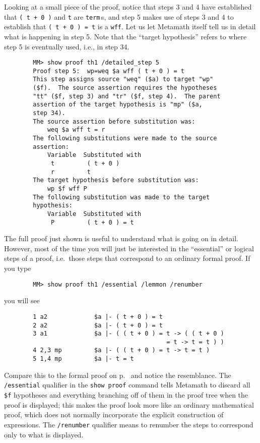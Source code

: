 Looking at a small piece of the proof, notice that steps 3 and 4 have
established that
\texttt{( t + 0 )} and \texttt{t} are \texttt{term}\,s, and step 5 makes use of steps 3 and
4 to establish that \texttt{( t + 0 ) = t} is a \texttt{wff}.  Let us let Metamath
itself tell us in detail what is happening in step 5.  Note that the
``target hypothesis'' refers to where step 5 is eventually used, i.e., in step
34.
\begin{verbatim}
        MM> show proof th1 /detailed_step 5
        Proof step 5:  wp=weq $a wff ( t + 0 ) = t
        This step assigns source "weq" ($a) to target "wp"
        ($f).  The source assertion requires the hypotheses
        "tt" ($f, step 3) and "tr" ($f, step 4).  The parent
        assertion of the target hypothesis is "mp" ($a,
        step 34).
        The source assertion before substitution was:
            weq $a wff t = r
        The following substitutions were made to the source
        assertion:
            Variable  Substituted with
             t         ( t + 0 )
             r         t
        The target hypothesis before substitution was:
            wp $f wff P
        The following substitution was made to the target
        hypothesis:
            Variable  Substituted with
             P         ( t + 0 ) = t
\end{verbatim}

The full proof just shown is useful to understand what is going on in detail.
However, most of the time you will just be interested in
the ``essential'' or logical steps of a proof, i.e.\ those steps
that correspond to an
ordinary formal proof.  If you type
\begin{verbatim}
        MM> show proof th1 /essential /lemmon /renumber
\end{verbatim}
you will see\label{demoproof}
\begin{verbatim}
        1 a2             $a |- ( t + 0 ) = t
        2 a2             $a |- ( t + 0 ) = t
        3 a1             $a |- ( ( t + 0 ) = t -> ( ( t + 0 )
                                             = t -> t = t ) )
        4 2,3 mp         $a |- ( ( t + 0 ) = t -> t = t )
        5 1,4 mp         $a |- t = t
\end{verbatim}
Compare this to the formal proof on p.~\pageref{zeroproof} and
notice the resemblance.  The \texttt{/essential} qualifier in the \texttt{show
proof} command tells Metamath to discard all \texttt{\$f} hypotheses and everything branching off of them in the proof tree
when the proof is displayed; this makes the proof look more like an ordinary
mathematical proof, which does not normally incorporate the explicit
construction of expressions.  The \texttt{/renumber} qualifier means to renumber
the steps to correspond only to what is displayed.

